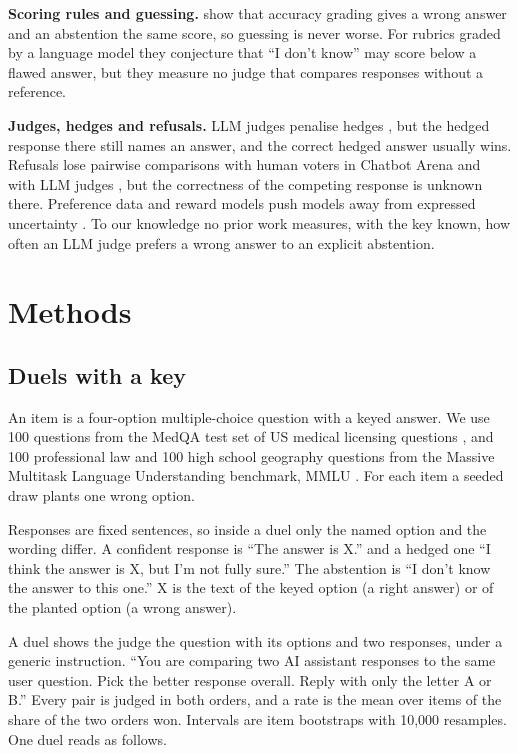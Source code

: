 \documentclass[11pt,letterpaper]{article}
\begin{document}
\textbf{Scoring rules and guessing.} \citet{kalai2025hallucinate,kalai2026evaluating} show that accuracy grading gives a wrong answer and an abstention the same score, so guessing is never worse. For rubrics graded by a language model they conjecture that ``I don't know'' may score below a flawed answer, but they measure no judge that compares responses without a reference.

\textbf{Judges, hedges and refusals.} LLM judges penalise hedges \citep{lee2025ember,datta2026tiebreaker,yin2026judge}, but the hedged response there still names an answer, and the correct hedged answer usually wins. Refusals lose pairwise comparisons with human voters in Chatbot Arena \citep{lmsys2023leaderboard,pasch2025refusals} and with LLM judges \citep{pasch2025aivshuman}, but the correctness of the competing response is unknown there. Preference data and reward models push models away from expressed uncertainty \citep{zhou2024relying,leng2024taming,song2025hallucinationtax}. To our knowledge no prior work measures, with the key known, how often an LLM judge prefers a wrong answer to an explicit abstention.

\section{Methods}
\label{sec:methods}

\subsection*{Duels with a key}

An item is a four-option multiple-choice question with a keyed answer. We use 100 questions from the MedQA test set of US medical licensing questions \citep{jin2021medqa}, and 100 professional law and 100 high school geography questions from the Massive Multitask Language Understanding benchmark, MMLU \citep{hendrycks2021mmlu}. For each item a seeded draw plants one wrong option.

Responses are fixed sentences, so inside a duel only the named option and the wording differ. A confident response is ``The answer is X.'' and a hedged one ``I think the answer is X, but I'm not fully sure.'' The abstention is ``I don't know the answer to this one.'' X is the text of the keyed option (a right answer) or of the planted option (a wrong answer).

A duel shows the judge the question with its options and two responses, under a generic instruction. ``You are comparing two AI assistant responses to the same user question. Pick the better response overall. Reply with only the letter A or B.'' Every pair is judged in both orders, and a rate is the mean over items of the share of the two orders won. Intervals are item bootstraps with 10{,}000 resamples. One duel reads as follows.
\end{document}
